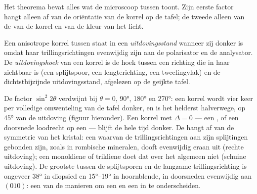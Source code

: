 Het theorema bevat alles wat de microscoop tussen  toont. Zijn eerste factor hangt alleen af van de oriëntatie van de korrel
op de tafel; de tweede alleen van de  van de korrel en van de kleur van het licht.

\begin{definition}\label{def:b1:optical-mineralogy:extinction}
Een anisotrope korrel tussen  staat in een \emph{uitdovingsstand} wanneer zij donker is omdat
haar trillingsrichtingen evenwijdig zijn aan de polarisator en de analysator. De \emph{uitdovingshoek} van een korrel is de hoek
tussen een richting die in haar zichtbaar is (een splijtspoor, een lengterichting, een tweelingvlak) en de dichtstbijzijnde uitdovingsstand, afgelezen op de
geijkte tafel.
\end{definition}

De factor $\sin^2 2\theta$ verdwijnt bij $\theta = 0$, \ang{90}, \ang{180} en \ang{270}: een korrel wordt vier keer per volledige omwenteling van de tafel donker,
en is het helderst halverwege, op \ang{45} van de uitdoving (figuur hieronder). Een korrel met $\Delta = 0$ --- een , of een doorsnede
loodrecht op een  --- blijft de hele tijd donker. De  hangt af van de symmetrie van het kristal: een  waarvan de
trillingsrichtingen aan zijn splijtingen gebonden zijn, zoals in rombische mineralen, dooft evenwijdig eraan uit (rechte uitdoving); een monokliene of
trikliene doet dat over het algemeen niet (schuine uitdoving). De grootste  tussen de splijtsporen en de langzame trillingsrichting is
ongeveer \ang{38} in diopsied en \ang{15}--\ang{19} in hoornblende, in doorsneden evenwijdig aan $(010)$: een van de manieren om een  en een
 in  te onderscheiden.

